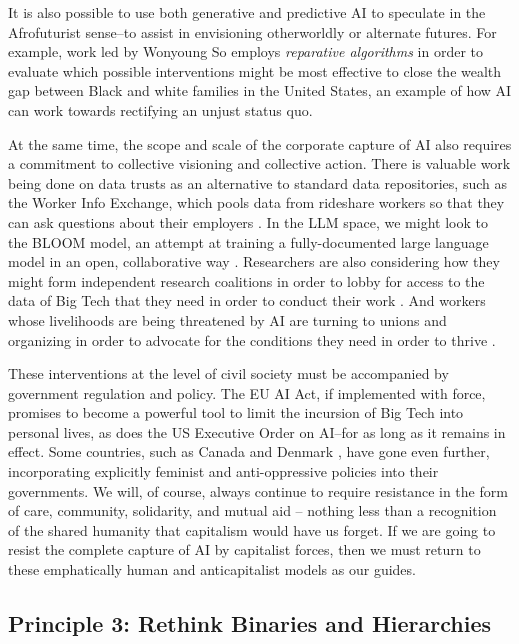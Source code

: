 It is also possible to use both generative and predictive AI to speculate in the Afrofuturist sense–to assist in envisioning otherworldly \cite{Hackett_2023, OBAI} or alternate futures. For example, work led by Wonyoung So \cite{So_2023} employs \textit{reparative algorithms} in order to evaluate which possible interventions might be most effective to close the wealth gap between Black and white families in the United States, an example of how AI can work towards rectifying an unjust status quo.


At the same time, the scope and scale of the corporate capture of AI also requires a commitment to collective visioning and collective action. There is valuable work being done on data trusts as an alternative to standard data repositories, such as the Worker Info Exchange, which pools data from rideshare workers so that they can ask questions about their employers \cite{Worker}. In the LLM space, we might look to the BLOOM model, an attempt at training a fully-documented large language model in an open, collaborative way \cite{Workshop_Scao_2023}. Researchers are also considering how they might form independent research coalitions in order to lobby for access to the data of Big Tech that they need in order to conduct their work \cite{Home}. And workers whose livelihoods are being threatened by AI are turning to unions and organizing in order to advocate for the conditions they need in order to thrive \cite{How_Hollywood, Hollywood_Actors}. 

These interventions at the level of civil society must be accompanied by government regulation and policy. The EU AI Act, if implemented with force, promises to become a powerful tool to limit the incursion of Big Tech into personal lives, as does the US Executive Order on AI–for as long as it remains in effect. Some countries, such as Canada \cite{Canada_2021} and Denmark \cite{In_Search}, have gone even further, incorporating explicitly feminist and anti-oppressive policies into their governments. We will, of course, always continue to require resistance in the form of care, community, solidarity, and mutual aid – nothing less than a recognition of the shared humanity that capitalism would have us forget. If we are going to resist the complete capture of AI by capitalist forces, then we must return to these emphatically human and anticapitalist models as our guides. 

\subsection{Principle 3: Rethink Binaries and Hierarchies}

